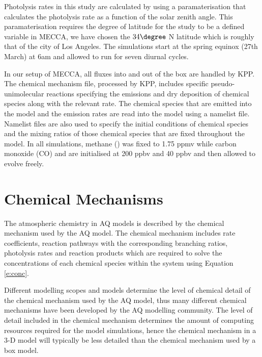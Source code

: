Photolysis rates in this study are calculated by using a paramaterisation that calculates the photolysis rate as a function of the solar zenith angle.
This paramaterisation requires the degree of latitude for the study to be a defined variable in MECCA, we have chosen the $34\degree$ N latitude which is roughly that of the city of Los Angeles.
The simulations start at the spring equinox (27th March) at 6am and allowed to run for seven diurnal cycles.

In our setup of MECCA, all fluxes into and out of the box are handled by KPP.
The chemical mechanism file, processed by KPP, includes specific pseudo-unimolecular reactions specifying the emissions and dry deposition of chemical species along with the relevant rate.
The chemical species that are emitted into the model and the emission rates are read into the model using a namelist file.
Namelist files are also used to specify the initial conditions of chemical species and the mixing ratios of those chemical species that are fixed throughout the model.
In all simulations, methane () was fixed to 1.75 ppmv while carbon monoxide (CO) and  are initialised at 200 ppbv and 40 ppbv and then allowed to evolve freely.

\section{Chemical Mechanisms}
The atmospheric chemistry in AQ models is described by the chemical mechanism used by the AQ model. 
The chemical mechanism includes rate coefficients, reaction pathways with the corresponding branching ratios, photolysis rates and reaction products which are required to solve the concentrations of each chemical species within the system using Equation \eqref{e:conc}.

Different modelling scopes and models determine the level of chemical detail of the chemical mechanism used by the AQ model, thus many different chemical mechanisms have been developed by the AQ modelling community.
The level of detail included in the chemical mechanism determines the amount of computing resources required for the model simulations, hence the chemical mechanism in a 3-D model will typically be less detailed than the chemical mechanism used by a box model.

